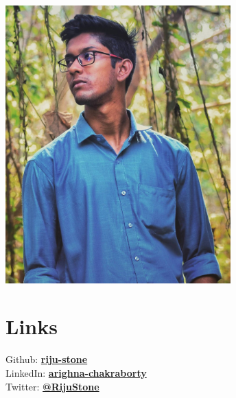 \documentclass[]{dev-cv}
\begin{document}
%
%

%
%

\begin{minipage}[t]{0.33\textwidth} 


\vspace{\topsep}
\includegraphics[width=0.65\textwidth]{riju.jpeg}
\sectionsep


\section{Links} 
Github: \href{https://github.com/riju-stone}{\bf riju-stone} \\
LinkedIn: \href{https://www.linkedin.com/in/arighna-chakraborty-509539113/}{\bf arighna-chakraborty} \\
Twitter: \href{https://twitter.com/RijuStone}{\bf @RijuStone} \\
\sectionsep



\end{minipage}
\end{document}
